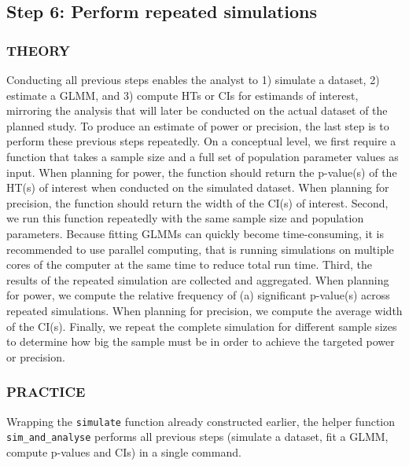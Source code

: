\documentclass[
  man,
  floatsintext,
  longtable,
  a4paper,
  nolmodern,
  notxfonts,
  notimes,
  colorlinks=true,linkcolor=blue,citecolor=blue,urlcolor=blue]{apa7}
\begin{document}
\subsection{Step 6: Perform repeated
simulations}\label{step-6-perform-repeated-simulations}

\subsubsection{THEORY}\label{theory-8}

Conducting all previous steps enables the analyst to 1) simulate a
dataset, 2) estimate a GLMM, and 3) compute HTs or CIs for estimands of
interest, mirroring the analysis that will later be conducted on the
actual dataset of the planned study. To produce an estimate of power or
precision, the last step is to perform these previous steps repeatedly.
On a conceptual level, we first require a function that takes a sample
size and a full set of population parameter values as input. When
planning for power, the function should return the p-value(s) of the
HT(s) of interest when conducted on the simulated dataset. When planning
for precision, the function should return the width of the CI(s) of
interest. Second, we run this function repeatedly with the same sample
size and population parameters. Because fitting GLMMs can quickly become
time-consuming, it is recommended to use parallel computing, that is
running simulations on multiple cores of the computer at the same time
to reduce total run time. Third, the results of the repeated simulation
are collected and aggregated. When planning for power, we compute the
relative frequency of (a) significant p-value(s) across repeated
simulations. When planning for precision, we compute the average width
of the CI(s). Finally, we repeat the complete simulation for different
sample sizes to determine how big the sample must be in order to achieve
the targeted power or precision.

\subsubsection{PRACTICE}\label{practice-8}

Wrapping the \texttt{simulate} function already constructed earlier, the
helper function \texttt{sim\_and\_analyse} performs all previous steps
(simulate a dataset, fit a GLMM, compute p-values and CIs) in a single
command.
\end{document}
